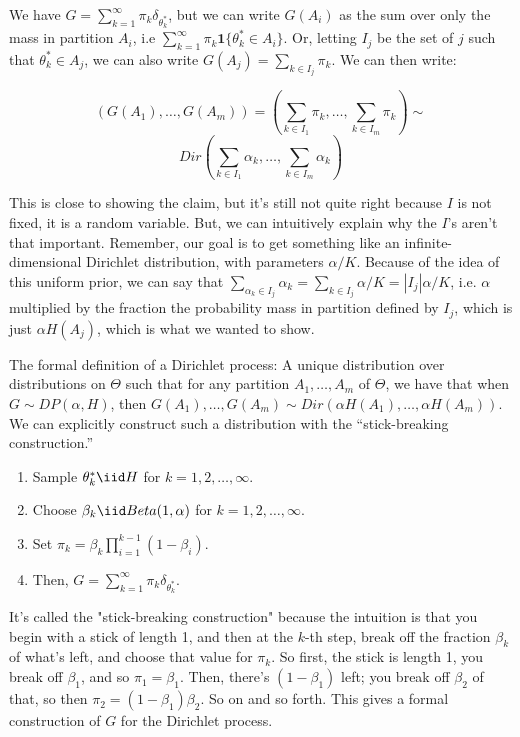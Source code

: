 We have $G = \sum_{k = 1}^\infty \pi_k \delta_{\theta_k^*}$, but we can write $G(A_i)$ as the sum over only the mass in partition $A_i$, i.e $\sum_{k = 1}^\infty \pi_k \mathbf{1}\{\theta_k^* \in A_i\}$. Or, letting $I_j$ be the set of $j$ such that $\theta_k^* \in A_j$, we can also write $G(A_j) = \sum_{k \in I_j} \pi_k$. We can then write:

$$(G(A_1), \ldots, G(A_m)) = \left(	\sum\limits_{k \in I_1} \pi_k, \ldots, \sum\limits_{k \in I_m} \pi_k 	\right) \sim$$
$$Dir(\sum\limits_{k \in I_1} \alpha_k, \ldots, \sum\limits_{k \in I_m} \alpha_k)$$

This is close to showing the claim, but it's still not quite right because $I$ is not fixed, it is a random variable. But, we can intuitively explain why the $I$'s aren't that important. Remember, our goal is to get something like an infinite-dimensional Dirichlet distribution, with parameters $\alpha / K$. Because of the idea of this uniform prior, we can say that $\sum_{\alpha_k \in I_j}\alpha_k = \sum_{k \in I_j} \alpha / K = |I_j| \alpha / K $, i.e. $\alpha$ multiplied by the fraction the probability mass in partition defined by $I_j$, which is just $\alpha H(A_j)$, which is what we wanted to show.

The formal definition of a Dirichlet process: A unique distribution over distributions on $\Theta$ such that for any partition $A_1, \ldots, A_m$ of $\Theta$, we have that when $G \sim DP(\alpha, H)$, then $G(A_1), \ldots, G(A_m) \sim Dir(\alpha H(A_1), \ldots, \alpha H(A_m))$. We can explicitly construct such a distribution with the ``stick-breaking construction.'' 
\begin{enumerate}
\item Sample $\theta_k^* \iid H$ for $k = 1, 2, \ldots, \infty$.
\item Choose $\beta_k \iid Beta(1, \alpha)$ for $k = 1, 2, \ldots, \infty$.
\item Set $\pi_k = \beta_k \prod\limits_{i = 1}^{k - 1} (1 - \beta_i)$.
\item Then, $G = \sum_{k = 1}^\infty \pi_k \delta_{\theta_k^*}$.
\end{enumerate}

It's called the "stick-breaking construction" because the intuition is that you begin with a stick of length 1, and then at the $k$-th step, break off the fraction $\beta_k$ of what's left, and choose that value for $\pi_k$. So first, the stick is length 1, you break off $\beta_1$, and so $\pi_1 = \beta_1$. Then, there's $(1 - \beta_1)$ left; you break off $\beta_2$ of that, so then $\pi_2 = (1 - \beta_1)\beta_2$. So on and so forth. This gives a formal construction of $G$ for the Dirichlet process.

